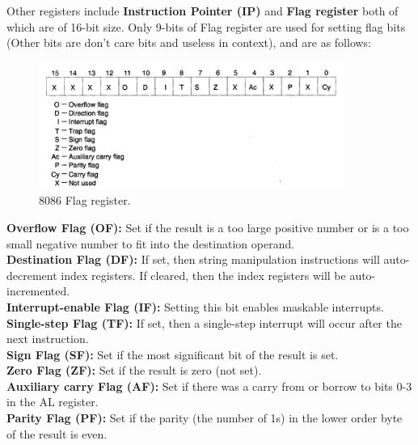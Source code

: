 \documentclass[12pt, a4paper]{scrartcl}
\begin{document}
	Other registers include \textbf{Instruction Pointer (IP)} and \textbf{Flag register} both of which are of 16-bit size. Only 9-bits of Flag register are used for setting flag bits (Other bits are don't care bits and useless in context), and are as follows: \\
	
	\begin{figure}[h]
		\centering
		\includegraphics[width=0.89\textwidth]{images/8086-flag-registers.png}
		\caption{8086 Flag register.}
		\label{image-4}
	\end{figure}
	
	\textbf{Overflow Flag (OF): }Set if the result is a too large positive number or is a too small negative number to fit into the destination operand. \\
	
	\textbf{Destination Flag (DF): }If set, then string manipulation instructions will auto-decrement index registers. If cleared, then the index registers will be auto-incremented. \\
	
	\textbf{Interrupt-enable Flag (IF): }Setting this bit enables maskable interrupts. \\
	
	\textbf{Single-step Flag (TF): }If set, then a single-step interrupt will occur after the next instruction. \\
	
	\textbf{Sign Flag (SF): }Set if the most significant bit of the result is set. \\
	
	\textbf{Zero Flag (ZF): }Set if the result is zero (not set). \\
	
	\textbf{Auxiliary carry Flag (AF): }Set if there was a carry from or borrow to bits 0-3 in the AL register. \\
	
	\textbf{Parity Flag (PF): }Set if the parity (the number of 1s) in the lower order byte of the result is even. \\
	
\end{document}
